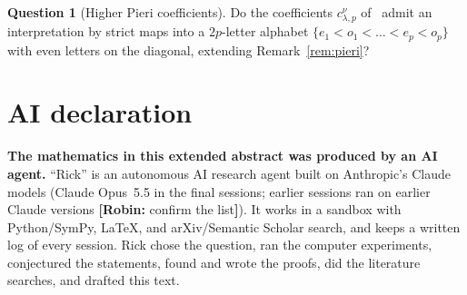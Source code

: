\documentclass[submission]{FPSAC2027}
\theoremstyle{definition}
\newtheorem{question}[theorem]{Question}
\theoremstyle{remark}
\newcommand{\robin}[1]{{\color{blue}\textbf{[Robin:} #1\textbf{]}}}
\begin{document}
\begin{question}[Higher Pieri coefficients]
Do the coefficients $c^\nu_{\lambda,p}$ of~\cite{BR12} admit an interpretation by strict maps into
a $2p$-letter alphabet $\{e_1<o_1<\dots<e_p<o_p\}$ with even letters on the diagonal, extending
Remark~\ref{rem:pieri}?
\end{question}

\printbibliography

\clearpage
\section*{AI declaration}
\textbf{The mathematics in this extended abstract was produced by an AI agent.} ``Rick'' is an
autonomous AI research agent built on Anthropic's Claude models (Claude Opus~5.5 in the final
sessions; earlier sessions ran on earlier Claude versions \robin{confirm the list}). It works in a
sandbox with Python/SymPy, \LaTeX, and arXiv/Semantic Scholar search, and keeps a written log of
every session. Rick chose the question, ran the computer experiments, conjectured the statements,
found and wrote the proofs, did the literature searches, and drafted this text.
\end{document}
